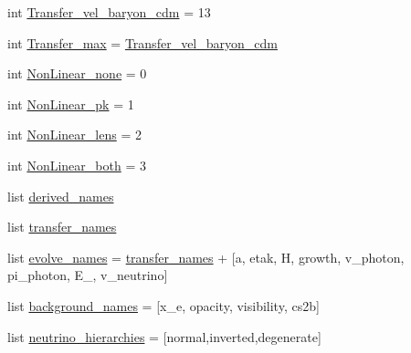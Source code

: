 \begin{DoxyCompactItemize}
int \mbox{\hyperlink{namespacecamb_1_1model_a111de36b8fbe4150ebb369051a847387}{Transfer\+\_\+vel\+\_\+baryon\+\_\+cdm}} = 13
\item 
int \mbox{\hyperlink{namespacecamb_1_1model_a41edfb9edfe73c1817aec0d0bc425fab}{Transfer\+\_\+max}} = \mbox{\hyperlink{namespacecamb_1_1model_a111de36b8fbe4150ebb369051a847387}{Transfer\+\_\+vel\+\_\+baryon\+\_\+cdm}}
\item 
int \mbox{\hyperlink{namespacecamb_1_1model_a446328f252e6fbd7d802669f2e350770}{Non\+Linear\+\_\+none}} = 0
\item 
int \mbox{\hyperlink{namespacecamb_1_1model_ab11025be2addf6278b78180fcbb3ef43}{Non\+Linear\+\_\+pk}} = 1
\item 
int \mbox{\hyperlink{namespacecamb_1_1model_a366958e503447c58cd4957de72964562}{Non\+Linear\+\_\+lens}} = 2
\item 
int \mbox{\hyperlink{namespacecamb_1_1model_abbeee0b52ba0b64270b52a1b1beef2db}{Non\+Linear\+\_\+both}} = 3
\item 
list \mbox{\hyperlink{namespacecamb_1_1model_a9b00248528fe3ce4ddd0796aa2f788db}{derived\+\_\+names}}
\item 
list \mbox{\hyperlink{namespacecamb_1_1model_a6f3d2cc1125ff8d4dd9b2a7a311929b1}{transfer\+\_\+names}}
\item 
list \mbox{\hyperlink{namespacecamb_1_1model_a54f64726c80596131e388af10aa41cb6}{evolve\+\_\+names}} = \mbox{\hyperlink{namespacecamb_1_1model_a6f3d2cc1125ff8d4dd9b2a7a311929b1}{transfer\+\_\+names}} + \mbox{[}\textquotesingle{}a\textquotesingle{}, \textquotesingle{}etak\textquotesingle{}, \textquotesingle{}H\textquotesingle{}, \textquotesingle{}growth\textquotesingle{}, \textquotesingle{}v\+\_\+photon\textquotesingle{}, \textquotesingle{}pi\+\_\+photon\textquotesingle{}, \textquotesingle{}E\+\_\textquotesingle{}, \textquotesingle{}v\+\_\+neutrino\textquotesingle{}\mbox{]}
\item 
list \mbox{\hyperlink{namespacecamb_1_1model_ad21210b2a1480586c2da0e821e0f5dfb}{background\+\_\+names}} = \mbox{[}\textquotesingle{}x\+\_\+e\textquotesingle{}, \textquotesingle{}opacity\textquotesingle{}, \textquotesingle{}visibility\textquotesingle{}, \textquotesingle{}cs2b\textquotesingle{}\mbox{]}
\item 
list \mbox{\hyperlink{namespacecamb_1_1model_a32503f8d98681aa09b440a004586ea04}{neutrino\+\_\+hierarchies}} = \mbox{[}\textquotesingle{}normal\textquotesingle{},\textquotesingle{}inverted\textquotesingle{},\textquotesingle{}degenerate\textquotesingle{}\mbox{]}
\item 

\end{DoxyCompactItemize}
